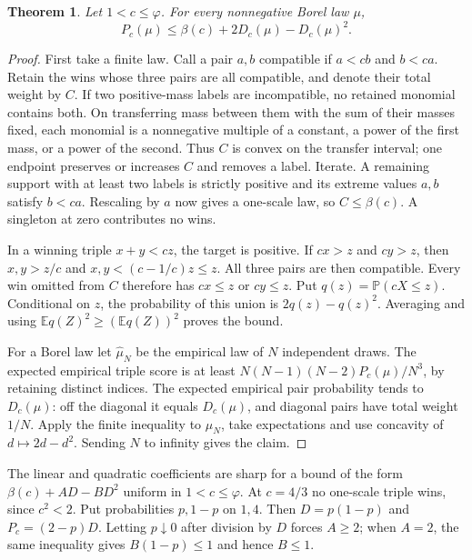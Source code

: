 \documentclass[11pt]{article}
\newtheorem{theorem}{Theorem}
\newcommand{\bbP}{\mathbb P}
\newcommand{\ph}{\varphi}
\begin{document}
\begin{theorem}\label{th:spread}
Let $1<c\le\ph$. For every nonnegative Borel law $\mu$,
\[
 P_c(\mu)\le\beta(c)+2D_c(\mu)-D_c(\mu)^2 .
\]
\end{theorem}
\begin{proof}
First take a finite law. Call a pair $a,b$ compatible if $a<cb$ and
$b<ca$. Retain the wins whose three pairs are all compatible, and
denote their total weight by $C$. If two positive-mass labels are
incompatible, no retained monomial contains both. On transferring
mass between them with the sum of their masses fixed, each monomial
is a nonnegative multiple of a constant, a power of the first mass,
or a power of the second. Thus $C$ is convex on the transfer interval;
one endpoint preserves or increases $C$ and removes a label.
Iterate. A remaining support with at least two labels is strictly
positive and its extreme values $a,b$ satisfy $b<ca$. Rescaling by
$a$ now gives a one-scale law, so $C\le\beta(c)$. A singleton at
zero contributes no wins.

In a winning triple $x+y<cz$, the target is positive. If $cx>z$ and
$cy>z$, then $x,y>z/c$ and $x,y<(c-1/c)z\le z$. All three pairs
are then compatible. Every win omitted from $C$ therefore has
$cx\le z$ or $cy\le z$. Put $q(z)=\bbP(cX\le z)$. Conditional on
$z$, the probability of this union is $2q(z)-q(z)^2$. Averaging and
using $\mathbb E q(Z)^2\ge (\mathbb E q(Z))^2$ proves the bound.

For a Borel law let $\widehat\mu_N$ be the empirical law of $N$
independent draws. The expected empirical triple score is at least
$N(N-1)(N-2)P_c(\mu)/N^3$, by retaining distinct indices.
The expected empirical pair probability tends to $D_c(\mu)$:
off the diagonal it equals $D_c(\mu)$, and diagonal pairs have total
weight $1/N$. Apply the finite inequality to $\widehat\mu_N$, take
expectations and use concavity of $d\mapsto2d-d^2$. Sending
$N$ to infinity gives the claim.
\end{proof}

The linear and quadratic coefficients are sharp for a bound
of the form $\beta(c)+AD-BD^2$ uniform in $1<c\le\ph$.
At $c=4/3$ no one-scale triple wins, since $c^2<2$. Put probabilities
$p,1-p$ on $1,4$. Then $D=p(1-p)$ and $P_c=(2-p)D$.
Letting $p\downarrow0$ after division by $D$ forces $A\ge2$; when
$A=2$, the same inequality gives $B(1-p)\le1$ and hence $B\le1$.
\end{document}
